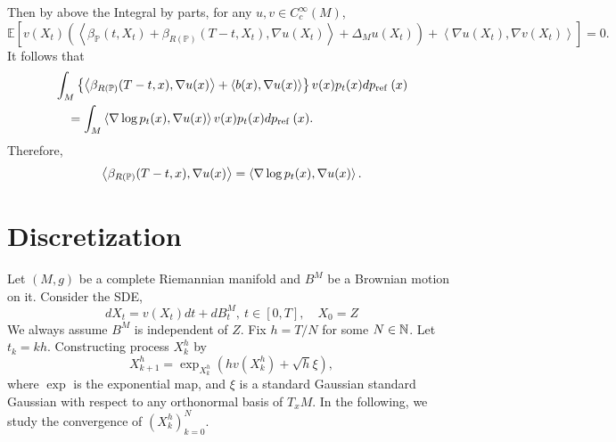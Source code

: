 Then by above the Integral by parts, for any $u,v \in C_c^\infty(M)$,
\begin{equation*}
    \mathbb{E}\left[v\left({X}_t\right)\left(\left\langle\beta_{\mathbb{P}}\left(t, {X}_t\right)+\beta_{R(\mathbb{P})}\left(T-t, {X}_t\right), \nabla u\left({X}_t\right)\right\rangle+\Delta_{M} u\left({X}_t\right)\right)+\left\langle\nabla u\left({X}_t\right), \nabla v\left({X}_t\right)\right\rangle\right]=0 .
\end{equation*}
It follows that
\begin{align*}
    &\int_{M}\left\{\left\langle\beta_{R(\mathbb{P})}(T-t, x), \nabla u(x)\right\rangle+\langle b(x), \nabla u(x)\rangle\right\} v(x) p_t(x) d p_{\text {ref }}(x) \\
    &\quad= \int_M \left\langle \nabla \log p_t(x),\nabla u(x) \right\rangle v(x)p_t(x)dp_{\text {ref }}(x).
\end{align*}
Therefore,
\begin{equation*}
    \left\langle\beta_{R(\mathbb{P})}(T-t, x), \nabla u(x)\right\rangle = \left\langle \nabla \log p_t(x),\nabla u(x) \right\rangle.
\end{equation*}


\section{Discretization}

Let $(M,g)$ be a complete Riemannian manifold and $B^M$ be a Brownian motion on it. Consider the SDE, 
$$ 
dX_t = v(X_t)dt + dB^M_t,~t \in [0,T],\quad X_0 = Z
$$ 
We always assume $B^M$ is independent of $Z$. Fix $h = T/N$ for some $N \in \mathbb{N}$. Let $t_k = kh$. Constructing process $X^h_k$ by 
$$
X^h_{k+1} = \exp_{X^h_k}(hv(X^h_k) + \sqrt{h}\xi), 
$$
where $\exp$ is the exponential map, and $\xi$ is a standard Gaussian standard Gaussian with respect to any orthonormal basis of $T_xM$. In the following, we study the convergence of $(X^h_k)_{k=0}^N$.

